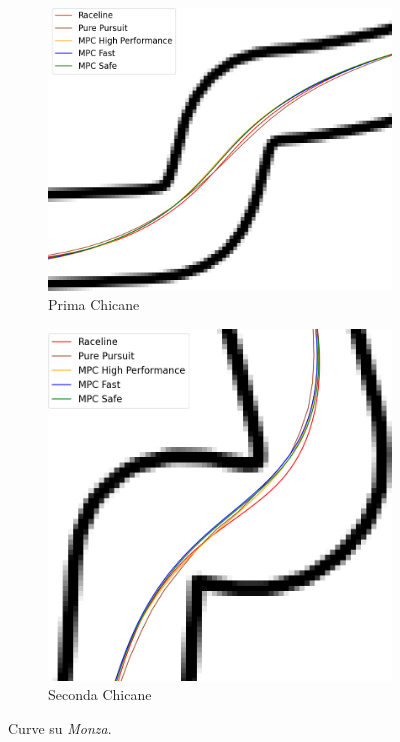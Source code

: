 \begin{figure}[H]
    \centering
    \begin{subfigure}[b]{0.49\textwidth}
        \centering
        \includegraphics[width=\textwidth]{images/monza_traj_comparison_chicane.png} 
        \caption{Prima Chicane}
        \label{fig:chic_monza}
    \end{subfigure}
    \hfill
    \begin{subfigure}[b]{0.49\textwidth}
        \centering
        \includegraphics[width=\textwidth]{images/monza_traj_comparison_chicane2.png}
        \caption{Seconda Chicane}
        \label{fig:chic2_monza}
    \end{subfigure}
    \caption{Curve su \textit{Monza}.}
    \label{fig:fig15} %
\end{figure}
